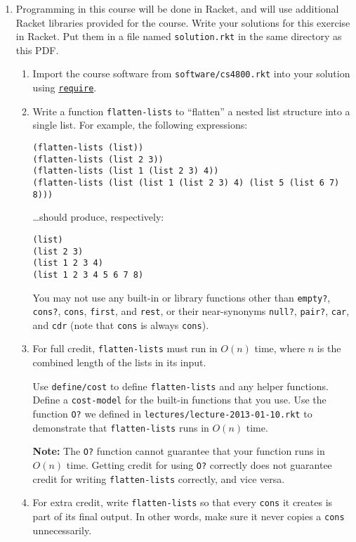 \documentclass{article}
\begin{document}
\begin{enumerate}
\pagebreak[1]
\item
  Programming in this course will be done in Racket, and will use additional
  Racket libraries provided for the course.  Write your solutions for this
  exercise in Racket.  Put them in a file named \texttt{solution.rkt} in the
  same directory as this PDF.
  \begin{enumerate}
  \item
    Import the course software from \texttt{software/cs4800.rkt} into your
    solution using
    \href{http://docs.racket-lang.org/reference/require.html}{\texttt{require}}.
  \item
    Write a function \texttt{flatten-lists} to ``flatten'' a nested list
    structure into a single list.  For example, the following expressions:
    \begin{verbatim}
(flatten-lists (list))
(flatten-lists (list 2 3))
(flatten-lists (list 1 (list 2 3) 4))
(flatten-lists (list (list 1 (list 2 3) 4) (list 5 (list 6 7) 8))) \end{verbatim}
    \dots should produce, respectively:
    \begin{verbatim}
(list)
(list 2 3)
(list 1 2 3 4)
(list 1 2 3 4 5 6 7 8) \end{verbatim}
    You may not use any built-in or library functions other than
    \texttt{empty?}, \texttt{cons?}, \texttt{cons}, \texttt{first},
    and \texttt{rest}, or their near-synonyms \texttt{null?}, \texttt{pair?}, 
    \texttt{car}, and \texttt{cdr} (note that \texttt{cons} is always
    \texttt{cons}).
  \item
    For full credit, \texttt{flatten-lists} must run in \(O(n)\) time, where
    \(n\) is the combined length of the lists in its input.

    Use \texttt{define/cost} to define \texttt{flatten-lists} and any helper
    functions.  Define a \texttt{cost-model} for the built-in functions that you
    use.  Use the function \texttt{O?} we defined in
    \texttt{lectures/lecture-2013-01-10.rkt} to demonstrate that
    \texttt{flatten-lists} runs in \(O(n)\) time.

    \textbf{Note:} The \texttt{O?} function cannot guarantee that your function
    runs in \(O(n)\) time.  Getting credit for using \texttt{O?} correctly does
    not guarantee credit for writing \texttt{flatten-lists} correctly, and vice
    versa.
  \item
    For extra credit, write \texttt{flatten-lists} so that every \texttt{cons}
    it creates is part of its final output.  In other words, make sure it never
    copies a \texttt{cons} unnecessarily.
  \end{enumerate}


\end{enumerate}
\end{document}
